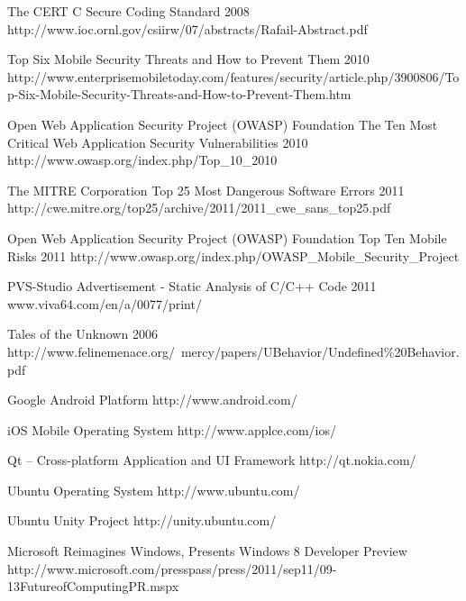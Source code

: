 \begin{thebibliography}{9}
		{
			\biband
			}
		{The {CERT} {C} Secure Coding Standard}
		{2008}
		{http://www.ioc.ornl.gov/csiirw/07/abstracts/Rafail-Abstract.pdf}
		
		{}
		{Top Six Mobile Security Threats and How to Prevent Them}
		{2010}
		{http://www.enterprisemobiletoday.com/features/security/article.php/3900806/Top-Six-Mobile-Security-Threats-and-How-to-Prevent-Them.htm}
		
		{Open Web Application Security Project (OWASP) Foundation}
		{The Ten Most Critical Web Application Security Vulnerabilities}
		{2010}
		{http://www.owasp.org/index.php/Top_10_2010}
	
		{The MITRE Corporation}
		{Top 25 Most Dangerous Software Errors}
		{2011}
		{http://cwe.mitre.org/top25/archive/2011/2011_cwe_sans_top25.pdf}
		
		{Open Web Application Security Project (OWASP) Foundation}
		{Top Ten Mobile Risks}
		{2011}
		{http://www.owasp.org/index.php/OWASP_Mobile_Security_Project}
		
		{
			\biband
			}
		{PVS-Studio Advertisement - Static Analysis of C/C++ Code}
		{2011}
		{www.viva64.com/en/a/0077/print/}


		{Tales of the Unknown}
		{2006}
		{http://www.felinemenace.org/~mercy/papers/UBehavior/Undefined\%20Behavior.pdf}
	

		{Google Android Platform}
		{http://www.android.com/}
	
		{iOS Mobile Operating System}
		{http://www.applce.com/ios/}
		
		{Qt -- Cross-platform Application and UI Framework}
		{http://qt.nokia.com/}
	
		{Ubuntu Operating System}
		{http://www.ubuntu.com/}
		
		{Ubuntu Unity Project}
		{http://unity.ubuntu.com/}
	
		{Microsoft Reimagines Windows, Presents Windows 8 Developer Preview}
		{http://www.microsoft.com/presspass/press/2011/sep11/09-13FutureofComputingPR.mspx}

\end{thebibliography}